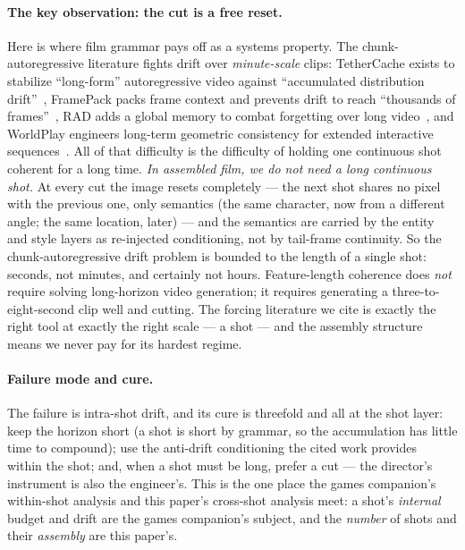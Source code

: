 \documentclass[11pt]{article}
\begin{document}
\paragraph{The key observation: the cut is a free reset.} Here is where film grammar pays off as a systems
property. The chunk-autoregressive literature fights drift over \emph{minute-scale} clips: TetherCache exists to
stabilize ``long-form'' autoregressive video against ``accumulated distribution drift''~\cite{tethercache},
FramePack packs frame context and prevents drift to reach ``thousands of frames''~\cite{framepack}, RAD adds a
global memory to combat forgetting over long video~\cite{rad}, and WorldPlay engineers long-term geometric
consistency for extended interactive sequences~\cite{worldplay}. All of that difficulty is the difficulty of
holding one continuous shot coherent for a long time. \emph{In assembled film, we do not need a long continuous
shot.} At every cut the image resets completely --- the next shot shares no pixel with the previous one, only
semantics (the same character, now from a different angle; the same location, later) --- and the semantics are
carried by the entity and style layers as re-injected conditioning, not by tail-frame continuity. So the
chunk-autoregressive drift problem is bounded to the length of a single shot: seconds, not minutes, and certainly
not hours. Feature-length coherence does \emph{not} require solving long-horizon video generation; it requires
generating a three-to-eight-second clip well and cutting. The forcing literature we cite is exactly the right
tool at exactly the right scale --- a shot --- and the assembly structure means we never pay for its hardest
regime.

\paragraph{Failure mode and cure.} The failure is intra-shot drift, and its cure is threefold and all at the
shot layer: keep the horizon short (a shot is short by grammar, so the accumulation has little time to compound);
use the anti-drift conditioning the cited work provides~\cite{tethercache,framepack} within the shot; and, when a
shot must be long, prefer a cut --- the director's instrument is also the engineer's. This is the one place the
games companion's within-shot analysis and this paper's cross-shot analysis meet: a shot's \emph{internal} budget
and drift are the games companion's subject, and the \emph{number} of shots and their \emph{assembly} are this
paper's.
\end{document}
